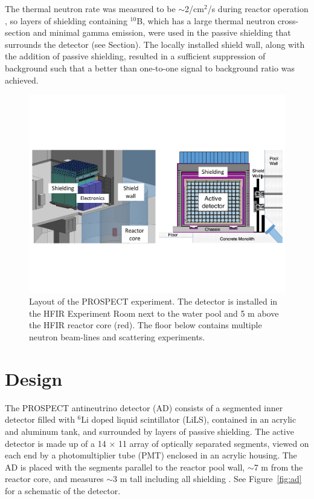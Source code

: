 The thermal neutron rate was measured to be $\sim$2/cm$^2$/s during reactor operation \cite{Ashenfelter:2015tpm}, so layers of shielding containing $^{10}$B, which has a large thermal neutron cross-section and minimal gamma emission, were used in the passive shielding that surrounds the detector (see Section). 
The locally installed shield wall, along with the addition of passive shielding, resulted in a sufficient suppression of background such that a better than one-to-one signal to background ratio was achieved. 

\begin{figure}[t]
	\centering
	\includegraphics[width=0.5\linewidth]{tex/4-prospect-images/Shielding}
	\caption[Layout of PROSPECT at HFIR]{Layout of the PROSPECT experiment. The detector is installed in the HFIR Experiment Room next to the water pool and 5 m above the HFIR reactor core (red). The floor below contains multiple neutron beam-lines and scattering experiments.}
	\label{fig:shielding}
\end{figure}

\section{Design}

The PROSPECT antineutrino detector (AD) consists of a segmented inner detector filled with $^6$Li doped liquid scintillator (LiLS), contained in an acrylic and aluminum tank, and surrounded by layers of passive shielding. 
The active detector is made up of a 14  $\times$ 11 array of optically separated segments, viewed on each end by a photomultiplier tube (PMT) enclosed in an acrylic housing. 
The AD is placed with the segments parallel to the reactor pool wall, $\sim$7 m from the reactor core, and measures $\sim$3 m tall including all shielding . 
See Figure~\ref{fig:ad} for a schematic of the detector. 

